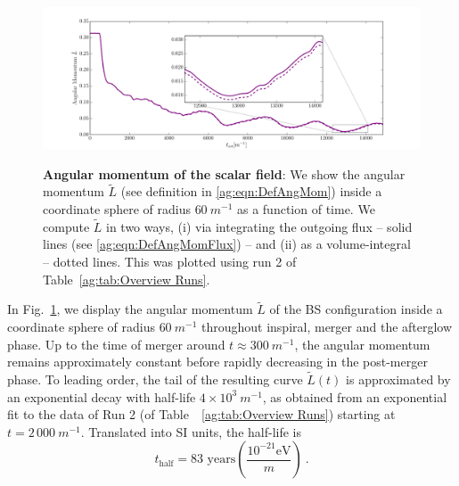 \begin{figure}[h!]
\begin{center}
{\includegraphics[width=1.0\columnwidth]{ag_fig/ang_integrated_flux_with_radius_60}}
\caption{
    {\bf Angular momentum of the scalar field}: We show the angular
    momentum $\tilde{L}$ (see definition in  \ref{ag:eqn:DefAngMom}) inside a coordinate sphere of radius $60~m^{-1}$ as a function of time. We compute
    $\tilde{L}$ in two ways, (i) via integrating the outgoing flux -- solid lines (see \ref{ag:eqn:DefAngMomFlux}) -- and (ii) as a volume-integral --
    dotted lines. This was plotted using run 2 of Table~\ref{ag:tab:Overview
    Runs}.}
\label{ag:fig:AngMom}
\end{center}
\end{figure}
In Fig.~\ref{ag:fig:AngMom}, we display
the angular momentum $\tilde{L}$ of the BS configuration
inside a coordinate sphere of radius $60~m^{-1}$ throughout
inspiral, merger and the afterglow phase. Up to the time
of merger around $t\approx 300~m^{-1}$, the angular momentum
remains approximately constant before rapidly decreasing
in the post-merger phase. To leading order,
the tail of the resulting curve
$\tilde{L}(t)$ is approximated by an exponential decay with
half-life $4\times10^3~m^{-1}$, as obtained from an exponential
fit to the data of Run 2 (of Table~~\ref{ag:tab:Overview Runs}) starting at $t=2\,000~m^{-1}$.
Translated into SI units, the half-life is
\begin{equation}
    t_{\text{half}} = 83 \text{ years}  \left(\frac{10^{-21}
    \text{eV}}{m}\right)~\label{ag:eqn:decay_time}.
\end{equation}


